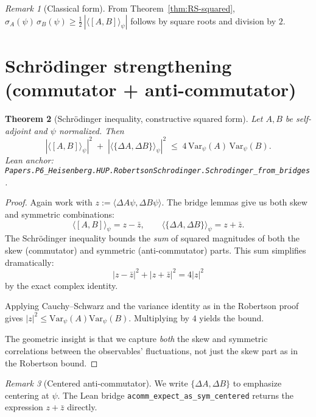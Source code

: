 \documentclass[11pt]{article}
\newcommand{\lean}[1]{\texttt{#1}}
\newcommand{\leanok}{\text{\tiny [✓ Lean Verified]}}
\newcommand{\ip}[2]{\langle #1, #2 \rangle}
\newcommand{\E}[1]{\langle #1 \rangle}
\newcommand{\comm}[2]{[#1, #2]}
\newcommand{\acomm}[2]{\{#1, #2\}} %
\newcommand{\stddev}{\sigma}
\newcommand{\absC}[1]{\left| #1 \right|}
\newcommand{\abssq}[1]{\absC{#1}^{2}}
\newcommand{\Var}{\mathrm{Var}}
\theoremstyle{plain}
\newtheorem{theorem}{Theorem}[section]
\theoremstyle{definition}
\theoremstyle{remark}
\newtheorem{remark}[theorem]{Remark}
\begin{document}
\begin{remark}[Classical form]
From Theorem~\ref{thm:RS-squared},
$\stddev_A(\psi)\,\stddev_B(\psi)\ge \tfrac12\,\absC{\E{\comm{A}{B}}_\psi}$ follows by square roots and division by $2$.
\end{remark}

\section{Schrödinger strengthening (commutator + anti-commutator)}
\label{sec:Schrodinger}

\begin{theorem}[Schrödinger inequality, constructive squared form]\leanok
\label{thm:Schrodinger-squared}
Let $A,B$ be self-adjoint and $\psi$ normalized. Then
\[
  \abssq{\E{\comm{A}{B}}_\psi}
  \;+\;
  \abssq{\E{\acomm{\Delta A}{\Delta B}}_\psi}
  \;\le\; 4\,\Var_\psi(A)\,\Var_\psi(B).
\]
\emph{Lean anchor:} \lean{Papers.P6\_Heisenberg.HUP.RobertsonSchrodinger.Schrodinger\_from\_bridges}.
\end{theorem}

\begin{proof}
Again work with $z := \ip{\Delta A\psi}{\Delta B\psi}$. The bridge lemmas give us both skew and symmetric combinations:
\[
\E{\comm{A}{B}}_\psi = z - \bar{z}, \qquad \E{\acomm{\Delta A}{\Delta B}}_\psi = z + \bar{z}.
\]
The Schrödinger inequality bounds the \emph{sum} of squared magnitudes of both the skew (commutator) and symmetric (anti-commutator) parts. This sum simplifies dramatically:
\[
\abssq{z - \bar{z}} + \abssq{z + \bar{z}} = 4\abssq{z}
\]
by the exact complex identity.

Applying Cauchy--Schwarz and the variance identity as in the Robertson proof gives $\abssq{z} \leq \Var_\psi(A)\Var_\psi(B)$. Multiplying by $4$ yields the bound.

The geometric insight is that we capture \emph{both} the skew and symmetric correlations between the observables' fluctuations, not just the skew part as in the Robertson bound.
\end{proof}

\begin{remark}[Centered anti-commutator]
We write $\acomm{\Delta A}{\Delta B}$ to emphasize centering at $\psi$.
The Lean bridge \lean{acomm\_expect\_as\_sym\_centered} returns the expression $z+\bar z$ directly.
\end{remark}
\end{document}
